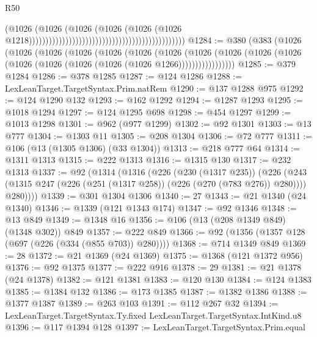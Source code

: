 \begin{lexlean}{R50}
\begin{coremodule}
                                                                                      (@1026
                                                                                        (@1026
                                                                                          (@1026
                                                                                            (@1026
                                                                                              (@1026
                                                                                                (@1026
                                                                                                  @1218)))))))))))))))))))))))))))))))))))))))))))))))
@1284 := @380
    (@383
      (@1026
        (@1026
          (@1026
            (@1026
              (@1026
                (@1026
                  (@1026
                    (@1026
                      (@1026 (@1026 (@1026 (@1026 (@1026 (@1026 (@1026 (@1026 @1266)))))))))))))))))
@1285 := @379 @1284
@1286 := @378 @1285
@1287 := @124 @1286
@1288 := LexLeanTarget.TargetSyntax.Prim.natRem
@1290 := @137 @1288 @975
@1292 := @124 @1290 @132
@1293 := @162 @1292
@1294 := @1287 @1293
@1295 := @1018 @1294
@1297 := @124 @1295 @698
@1298 := @454 @1297
@1299 := @1013 @1298
@1301 := @962 (@977 @1299)
@1302 := @92 @1301
@1303 := @13 @777
@1304 := @1303 @11
@1305 := @208 @1304
@1306 := @72 @777
@1311 := @106 (@13 (@1305 @1306) (@33 @1304))
@1313 := @218 @777 @64
@1314 := @1311 @1313
@1315 := @222 @1313
@1316 := @1315 @130
@1317 := @232 @1313
@1337 := @92
    (@1314
      (@1316
        (@226
          (@230 (@1317 @235))
          (@226
            (@243 (@1315 @247 (@226 (@251 (@1317 @258)) (@226 (@270 (@783 @276)) @280))))
            @280))))
@1339 := @301 @1304 @1306
@1340 := 27
@1343 := @21 @1340 (@24 @1340)
@1346 := @1339 (@121 @1343 @174)
@1347 := @92 @1346
@1348 := @13 @849
@1349 := @1348 @16
@1356 := @106 (@13 (@208 @1349 @849) (@1348 @302)) @849
@1357 := @222 @849
@1366 := @92 (@1356 (@1357 @128 (@697 (@226 (@334 (@855 @703)) @280))))
@1368 := @714 @1349 @849
@1369 := 28
@1372 := @21 @1369 (@24 @1369)
@1375 := @1368 (@121 @1372 @956)
@1376 := @92 @1375
@1377 := @222 @916
@1378 := 29
@1381 := @21 @1378 (@24 @1378)
@1382 := @121 @1381
@1383 := @120 @130
@1384 := @124 @1383
@1385 := @1384 @132
@1386 := @173 @1385
@1387 := @1382 @1386
@1388 := @1377 @1387
@1389 := @263 @103
@1391 := @112 @267 @32
@1394 := LexLeanTarget.TargetSyntax.Ty.fixed LexLeanTarget.TargetSyntax.IntKind.u8
@1396 := @117 @1394 @128
@1397 := LexLeanTarget.TargetSyntax.Prim.equal

\end{coremodule}
\end{lexlean}
